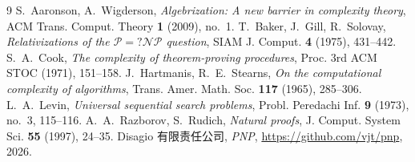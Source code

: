 \documentclass[11pt,a4paper]{amsart}
\theoremstyle{remark}
\begin{document}
\begin{thebibliography}{9}
 S.~Aaronson, A.~Wigderson,
  \emph{Algebrization: A new barrier in complexity theory},
  ACM Trans. Comput. Theory \textbf{1} (2009), no.~1.
 T.~Baker, J.~Gill, R.~Solovay,
  \emph{Relativizations of the $\mathcal{P} =? \mathcal{NP}$ question},
  SIAM J. Comput. \textbf{4} (1975), 431--442.
 S.~A.~Cook,
  \emph{The complexity of theorem-proving procedures},
  Proc. 3rd ACM STOC (1971), 151--158.
 J.~Hartmanis, R.~E.~Stearns,
  \emph{On the computational complexity of algorithms},
  Trans. Amer. Math. Soc. \textbf{117} (1965), 285--306.
 L.~A.~Levin,
  \emph{Universal sequential search problems},
  Probl. Peredachi Inf. \textbf{9} (1973), no.~3, 115--116.
 A.~A.~Razborov, S.~Rudich,
  \emph{Natural proofs},
  J. Comput. System Sci. \textbf{55} (1997), 24--35.
 Disagio 有限责任公司,
  \emph{PNP}, \url{https://github.com/vjt/pnp}, 2026.
\end{thebibliography}
\end{document}
